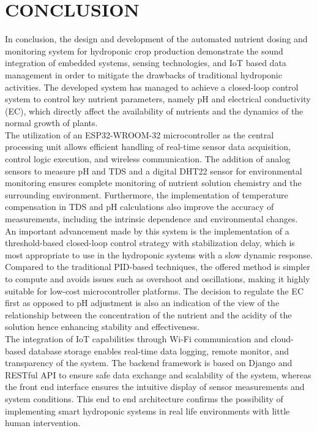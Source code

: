\chapter{CONCLUSION}
In conclusion, the design and development of the automated nutrient dosing and monitoring system for hydroponic crop production demonstrate the sound integration of embedded systems, sensing technologies, and IoT based data management in order to mitigate the drawbacks of traditional hydroponic activities. The developed system has managed to achieve a closed-loop control system to control key nutrient parameters, namely pH and electrical conductivity (EC), which directly affect the availability of nutrients and the dynamics of the normal growth of plants.\\[10pt]
The utilization of an ESP32-WROOM-32 microcontroller as the central processing unit allows efficient handling of real-time sensor data acquisition, control logic execution, and wireless communication. The addition of analog sensors to measure pH and TDS and a digital DHT22 sensor for environmental monitoring ensures complete monitoring of nutrient solution chemistry and the surrounding environment. Furthermore, the implementation of temperature compensation in TDS and pH calculations also improve the accuracy of measurements, including the intrinsic dependence and environmental changes.\\[10pt]
An important advancement made by this system is the implementation of a threshold-based closed-loop control strategy with stabilization delay, which is most appropriate to use in the hydroponic systems with a slow dynamic response. Compared to the traditional PID-based techniques, the offered method is simpler to compute and avoids issues such as overshoot and oscillations, making it highly suitable for low-cost microcontroller platforms. The decision to regulate the EC first as opposed to pH adjustment is also an indication of the view of the relationship between the concentration of the nutrient and the acidity of the solution hence enhancing stability and effectiveness.\\[10pt]
The integration of IoT capabilities through Wi-Fi communication and cloud-based database storage enables real-time data logging, remote monitor, and transparency of the system. The backend framework is based on Django and RESTful API to ensure safe data exchange and scalability of the system, whereas the front end interface ensures the intuitive display of sensor measurements and system conditions. This end to end architecture confirms the possibility of implementing smart hydroponic systems in real life environments with little human intervention.\\[10pt]
